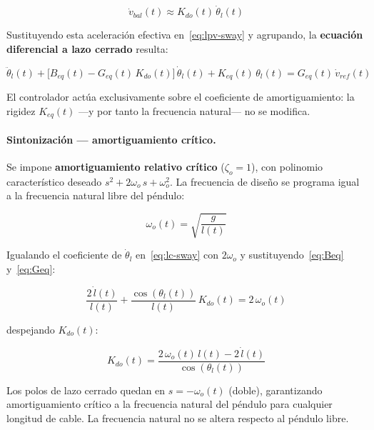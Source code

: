 \documentclass[12pt, a4paper]{article}
\begin{document}
\begin{equation}
    \label{eq:aeff}
    \dot{v}_{bal}(t) \approx K_{do}(t)\,\dot{\theta}_l(t)
\end{equation}

Sustituyendo esta aceleración efectiva en~\eqref{eq:lpv-sway} y agrupando, la
\textbf{ecuación diferencial a lazo cerrado} resulta:

\begin{equation}
    \label{eq:lc-sway}
    \ddot{\theta}_l(t)
    + \bigl[B_{eq}(t) - G_{eq}(t)\,K_{do}(t)\bigr]\,\dot{\theta}_l(t)
    + K_{eq}(t)\,\theta_l(t)
    = G_{eq}(t)\,\dot{v}_{ref}(t)
\end{equation}

El controlador actúa exclusivamente sobre el coeficiente de amortiguamiento: la rigidez
$K_{eq}(t)$ —y por tanto la frecuencia natural— no se modifica.

\paragraph{Sintonización — amortiguamiento crítico.}

Se impone \textbf{amortiguamiento relativo crítico} ($\zeta_o=1$), con polinomio
característico deseado $s^2+2\omega_o\,s+\omega_o^2$. La frecuencia de diseño se
programa igual a la frecuencia natural libre del péndulo:

\begin{equation}
    \label{eq:wo-lpv}
    \omega_o(t) = \sqrt{\frac{g}{l(t)}}
\end{equation}

Igualando el coeficiente de $\dot{\theta}_l$ en~\eqref{eq:lc-sway} con $2\omega_o$ y
sustituyendo~\eqref{eq:Beq} y~\eqref{eq:Geq}:

\begin{equation}
    \frac{2\,\dot{l}(t)}{l(t)} + \frac{\cos(\theta_l(t))}{l(t)}\,K_{do}(t) = 2\,\omega_o(t)
\end{equation}

despejando $K_{do}(t)$:

\begin{equation}
    \label{eq:Kdo}
    K_{do}(t) = \frac{2\,\omega_o(t)\,l(t) - 2\,\dot{l}(t)}{\cos(\theta_l(t))}
\end{equation}

Los polos de lazo cerrado quedan en $s=-\omega_o(t)$ (doble), garantizando
amortiguamiento crítico a la frecuencia natural del péndulo para cualquier longitud de
cable. La frecuencia natural no se altera respecto al péndulo libre.
\end{document}
